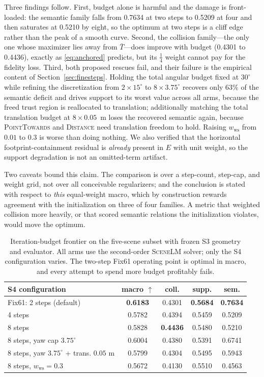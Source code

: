 \documentclass[10pt,twocolumn]{article}
\newcommand{\method}{\textsc{SceneLM}}
\begin{document}
Three findings follow.  First, budget alone is harmful and the damage is
front-loaded: the semantic family falls from 0.7634 at two steps to 0.5209 at
four and then saturates at 0.5210 by eight, so the optimum at two steps is a
cliff edge rather than the peak of a smooth curve.  Second, the collision
family---the only one whose maximizer lies away from $\bar T$---does improve
with budget (0.4301 to 0.4436), exactly as \eqref{eq:anchored} predicts, but
its $\tfrac14$ weight cannot pay for the fidelity loss.  Third, both proposed
rescues fail, and their failure is the empirical content of
Section~\ref{sec:finesteps}.  Holding the total angular budget fixed at
$30^\circ$ while refining the discretization from $2\times15^\circ$ to
$8\times3.75^\circ$ recovers only $63\%$ of the semantic deficit and drives
support to its worst value across all arms, because the freed trust region is
reallocated to translation; additionally matching the total translation budget
at $8\times0.05$~m loses the recovered semantic again, because
\textsc{PointTowards} and \textsc{Distance} need translation freedom to hold.
Raising $w_{\mathrm{ws}}$ from $0.01$ to $0.3$ is worse than doing nothing.  We
also verified that the horizontal footprint-containment residual is
\emph{already} present in $E$ with unit weight, so the support degradation is
not an omitted-term artifact.

Two caveats bound this claim.  The comparison is over a step-count, step-cap,
and weight grid, not over all conceivable regularizers; and the conclusion is
stated with respect to \emph{this} equal-weight macro, which by construction
rewards agreement with the initialization on three of four families.  A
metric that weighted collision more heavily, or that scored semantic relations
the initialization violates, would move the optimum.

\begin{table}[t]
\centering
\caption{Iteration-budget frontier on the five-scene subset with frozen S3
geometry and evaluator.  All arms use the second-order \method{} solver; only
the S4 configuration varies.  The two-step Fix61 operating point is optimal in
macro, and every attempt to spend more budget profitably fails.}
\label{tab:budget}
\small
\begin{tabular}{lcccc}
\toprule
S4 configuration & macro $\uparrow$ & coll. & supp. & sem. \\
\midrule
Fix61: 2 steps (default) & \textbf{0.6183} & 0.4301 & \textbf{0.5684} & \textbf{0.7634} \\
4 steps & 0.5782 & 0.4394 & 0.5459 & 0.5209 \\
8 steps & 0.5828 & \textbf{0.4436} & 0.5480 & 0.5210 \\
8 steps, yaw cap $3.75^\circ$ & 0.6004 & 0.4380 & 0.5391 & 0.6741 \\
8 steps, yaw $3.75^\circ$ + trans. $0.05$ m & 0.5799 & 0.4304 & 0.5495 & 0.5943 \\
8 steps, $w_{\mathrm{ws}}=0.3$ & 0.5672 & 0.4130 & 0.5510 & 0.4563 \\
\bottomrule
\end{tabular}
\end{table}
\end{document}
